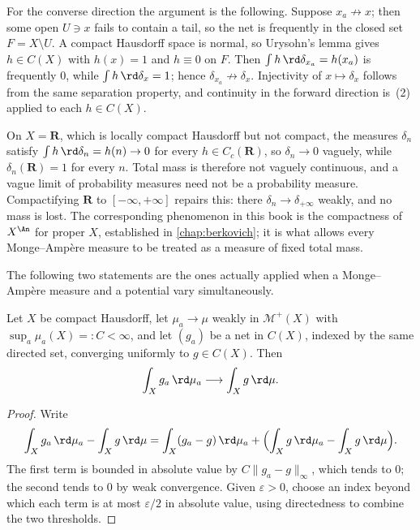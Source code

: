 For the converse direction the argument is the following.  Suppose
$x_a\not\to x$; then some open $U\ni x$ fails to contain a tail, so the net is
frequently in the closed set $F=X\setminus U$.  A compact Hausdorff space is
normal, so Urysohn's lemma gives $h\in C(X)$ with $h(x)=1$ and $h\equiv0$ on
$F$.  Then $\int h\,\rd\delta_{x_a}=h(x_a)$ is frequently $0$, while
$\int h\,\rd\delta_x=1$; hence $\delta_{x_a}\not\to\delta_x$.  Injectivity of
$x\mapsto\delta_x$ follows from the same separation property, and continuity
in the forward direction is \,(2) applied to each
$h\in C(X)$.

\begin{example}
\label{ex:vague-escape}
On $X=\mathbf R$, which is locally compact Hausdorff but not compact, the
measures $\delta_n$ satisfy $\int h\,\rd\delta_n=h(n)\to0$ for every
$h\in C_c(\mathbf R)$, so $\delta_n\to0$ vaguely, while $\delta_n(\mathbf R)=1$
for every $n$.  Total mass is therefore not vaguely continuous, and a vague
limit of probability measures need not be a probability measure.  Compactifying
$\mathbf R$ to $[-\infty,+\infty]$ repairs this: there $\delta_n\to
\delta_{+\infty}$ weakly, and no mass is lost.  The corresponding phenomenon
in this book is the compactness of $X^{\An}$ for proper $X$, established in
\cref{chap:berkovich}; it is what allows every Monge--Amp\`ere measure to be
treated as a measure of fixed total mass.
\end{example}

The following two statements are the ones actually applied when a
Monge--Amp\`ere measure and a potential vary simultaneously.

\begin{lemma}
\label{lem:joint-weak-uniform}
Let $X$ be compact Hausdorff, let $\mu_a\to\mu$ weakly in
$\mathcal M^+(X)$ with $\sup_a\mu_a(X)=:C<\infty$, and let $(g_a)$ be a net in
$C(X)$, indexed by the same directed set, converging uniformly to $g\in C(X)$.
Then
\[
 \int_Xg_a\,\rd\mu_a\longrightarrow\int_Xg\,\rd\mu .
\]
\end{lemma}

\begin{proof}
Write
\[
 \int_Xg_a\,\rd\mu_a-\int_Xg\,\rd\mu
 =\int_X(g_a-g)\,\rd\mu_a+\Bigl(\int_Xg\,\rd\mu_a-\int_Xg\,\rd\mu\Bigr).
\]
The first term is bounded in absolute value by
$C\lVert g_a-g\rVert_\infty$, which tends to $0$; the second tends to $0$ by
weak convergence.  Given $\varepsilon>0$, choose an index beyond which each
term is at most $\varepsilon/2$ in absolute value, using directedness to
combine the two thresholds.
\end{proof}

